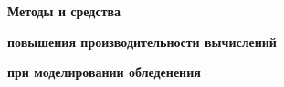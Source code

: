 \textbf{\large Методы и средства}

\textbf{\large повышения производительности вычислений}

\textbf{\large при моделировании обледенения}